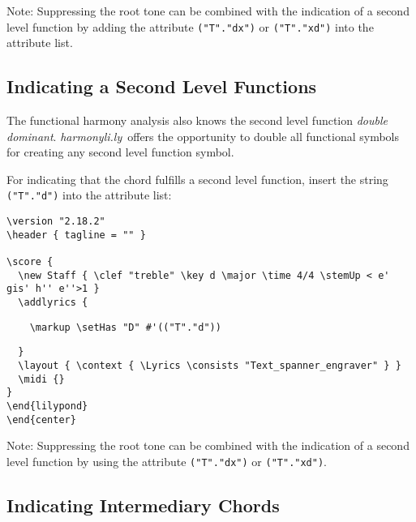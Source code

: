 \documentclass[
  DIV=calc,
  BCOR=5mm,
  12pt,
  headings=small,
  oneside,
  abstract=true,
  toc=bib,
  xcolor=dvipsnames,
  openany,
  ngerman,english]{scrartcl}
\newcommand{\acc}[0]{\textit}
\newcommand{\hlyn}[0]{\textit{harmonyli.ly}}
\begin{document}
Note: Suppressing the root tone can be combined with the indication of a second
level function by adding the attribute \texttt{("T"."dx")} or
\texttt{("T"."xd")} into the attribute list.

\subsection{Indicating a Second Level Functions}

The functional harmony analysis also knows the second level function \acc{double
dominant}. \hlyn\ offers the opportunity to double all functional symbols for
creating any second level function symbol.

For indicating that the chord fulfills a second level function, insert the string
\texttt{("T"."d")} into the attribute list:

\begin{center}
\end{center}

\begin{scriptsize}
\begin{verbatim}
\version "2.18.2"
\header { tagline = "" }

\score {
  \new Staff { \clef "treble" \key d \major \time 4/4 \stemUp < e' gis' h'' e''>1 }
  \addlyrics { 
\end{verbatim}
{ \color{red} \verb|    \markup \setHas "D" #'(("T"."d"))| }
\begin{verbatim}    
  }
  \layout { \context { \Lyrics \consists "Text_spanner_engraver" } }
  \midi {}
}
\end{lilypond}
\end{center}
\end{verbatim}
\end{scriptsize}

Note: Suppressing the root tone can be combined with the indication of a second
level function by using the attribute \texttt{("T"."dx")} or
\texttt{("T"."xd")}.

\subsection{Indicating Intermediary Chords}
\end{document}
